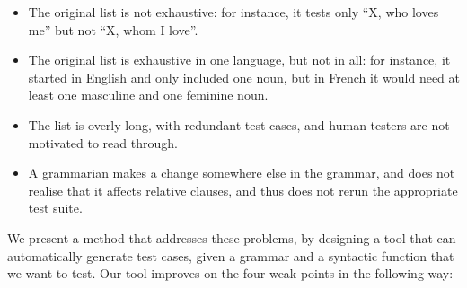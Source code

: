 \documentclass[11pt]{article}
\begin{document}

\begin{itemize}
\item The original list is not exhaustive: for instance, it tests only
``X, who loves me'' but not ``X, whom I love''. 
\item The original list is exhaustive in one language, but not in all:
for instance, it started in English and only included one noun, but in
French it would need at least one masculine and one feminine noun. 
\item The list is overly long, with redundant test cases, and human
testers are not motivated to read through. 
\item A grammarian makes a change somewhere else in the grammar, and
does not realise that it affects relative clauses, and thus does not
rerun the appropriate test suite. 
\end{itemize}

We present a method that addresses these problems, by designing a tool that can automatically generate test cases, given a grammar and a syntactic function that we want to test. Our tool improves on the four weak points in the following way:
\end{document}
